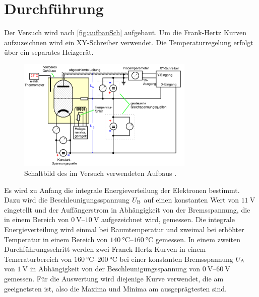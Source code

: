 \section{Durchführung}
\label{sec:Durchführung}

Der Versuch wird nach \autoref{fig:aufbauSch} aufgebaut. Um die Frank-Hertz Kurven aufzuzeichnen wird ein XY-Schreiber verwendet. Die Temperaturregelung erfolgt über ein separates Heizgerät.

\begin{figure}[H]
    \centering
    \includegraphics[width=0.75\textwidth]{data/schaltbild.png}
    \caption{Schaltbild des im Versuch verwendeten Aufbaus \cite{Anleitung601}.}
    \label{fig:aufbauSch}
\end{figure}

\noindent
Es wird zu Anfang die integrale Energieverteilung der Elektronen bestimmt. Dazu wird die Beschleunigungsspannung $U_{\text B}$ auf einen konstanten Wert von $\SI{11}{\volt}$ eingetellt und der Auffängerstrom in
Abhängigkeit von der Bremsspannung, die in einem Bereich von $\SIrange{0}{10}{\volt}$ aufgezeichnet wird, gemessen. Die integrale Energieverteilung wird einmal bei Raumtemperatur und zweimal bei erhöhter Temperatur in 
einem Bereich von $\SIrange{140}{160}{\degreeCelsius}$ gemessen. \newline
In einem zweiten Durchführungsschritt werden zwei Franck-Hertz Kurven in einem Temeraturbereich von $\SIrange{160}{200}{\degreeCelsius}$ bei einer konstanten Bremsspannung $U_{\text A}$ von $\SI{1}{\volt}$ in Abhängigkeit 
von der Beschleunigungsspannung von $\SIrange{0}{60}{\volt}$ gemessen. Für die Auswertung wird diejenige Kurve verwendet, die am geeignetsten ist, also die Maxima und Minima am ausgeprägtesten sind.
